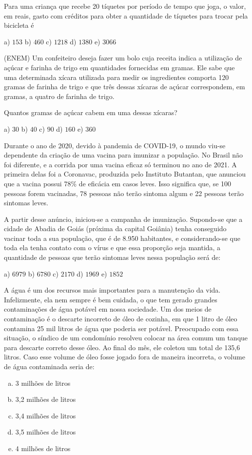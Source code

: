 \begin{multicols*}{2}
	Para uma criança que recebe 20 tíquetes por período de tempo que joga, o valor, em reais, gasto com créditos para
	obter a quantidade de tíquetes para trocar pela bicicleta é

	a) $153 $ b) $460 $ c) $1218 $ d) $1380 $ e) $3066 $

	\execnum (ENEM) Um confeiteiro deseja fazer um bolo cuja receita indica a utilização de açúcar e farinha de trigo em
	quantidades fornecidas em gramas. Ele sabe que uma determinada xícara utilizada para medir os ingredientes
	comporta 120 gramas de farinha de trigo e que três dessas xícaras de açúcar correspondem, em gramas, a quatro de
	farinha de trigo.

	Quantos gramas de açúcar cabem em uma dessas xícaras?

	a) $30 $ b) $40 $ c) $90 $ d) $160 $ e) $360 $

	\execnum Durante o ano de 2020, devido à pandemia de COVID-19, o mundo viu-se dependente da criação de uma vacina para imunizar a população. No Brasil não foi diferente, e a corrida por uma vacina eficaz só terminou no ano de 2021. A primeira delas foi a Coronavac, produzida pelo Instituto Butantan, que anunciou que a vacina possui 78\% de eficácia em casos leves. Isso significa que, se 100 pessoas forem vacinadas, 78 pessoas não terão sintoma algum e 22 pessoas terão sintomas leves.

	A partir desse anúncio, iniciou-se a campanha de imunização. Supondo-se que a cidade de Abadia de Goiás (próxima da capital Goiânia) tenha conseguido vacinar toda a sua população, que é de 8.950 habitantes, e considerando-se que toda ela tenha contato com o vírus e que essa proporção seja mantida, a quantidade de pessoas que terão sintomas leves nessa população será de:

	a) $6979 $ b) $6780 $ c) $2170 $ d) $1969 $ e) $1852 $

	\execnum A água é um dos recursos mais importantes para a manutenção da vida. Infelizmente, ela nem sempre é bem cuidada, o que tem gerado grandes contaminações de água potável em nossa sociedade. Um dos meios de contaminação é o descarte incorreto de óleo de cozinha, em que 1 litro de óleo contamina 25 mil litros de água que poderia ser potável. Preocupado com essa situação, o síndico de um condomínio resolveu colocar na área comum um tanque para descarte correto desse  óleo. Ao final do mês, ele coletou um total de 135,6 litros. Caso esse volume de óleo fosse jogado fora de maneira incorreta, o volume de água contaminada seria de:
	\begin{enumerate}[(a)]
		\item 3 milhões de litros
		\item 3,2 milhões de litros
		\item 3,4 milhões de litros
		\item 3,5 milhões de litros
		\item 4 milhões de litros
	\end{enumerate}


\end{multicols*}
